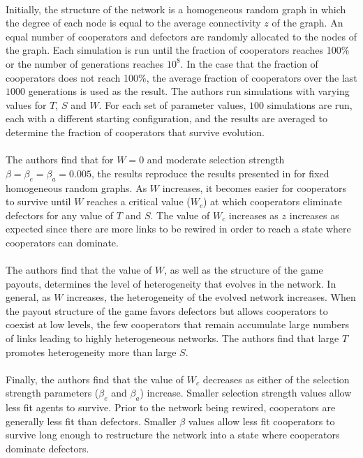 \documentclass{article}
\begin{document}
	\paragraph{}Initially, the structure of the network is a homogeneous random graph in which the degree of each node is equal to the average connectivity $z$ of the graph.  An equal number of cooperators and defectors are randomly allocated to the nodes of the graph.  Each simulation is run until the fraction of cooperators reaches 100\% or the number of generations reaches $10^8$.  In the case that the fraction of cooperators does not reach 100\%, the average fraction of cooperators over the last $1000$ generations is used as the result.  The authors run simulations with varying values for $T$, $S$ and $W$.  For each set of parameter values, $100$ simulations are run, each with a different starting configuration, and the results are averaged to determine the fraction of cooperators that survive evolution.
	\paragraph{}The authors find that for $W=0$ and moderate selection strength $\beta=\beta_e=\beta_a=0.005$, the results reproduce the results presented in \cite{Santos2006c} for fixed homogeneous random graphs.  As $W$ increases, it becomes easier for cooperators to survive until $W$ reaches a critical value ($W_c$) at which cooperators eliminate defectors for any value of $T$ and $S$.  The value of $W_c$ increases as $z$ increases as expected since there are more links to be rewired in order to reach a state where cooperators can dominate.
	\paragraph{}The authors find that the value of $W$, as well as the structure of the game payouts, determines the level of heterogeneity that evolves in the network.  In general, as $W$ increases, the heterogeneity of the evolved network increases.  When the payout structure of the game favors defectors but allows cooperators to coexist at low levels, the few cooperators that remain accumulate large numbers of links leading to highly heterogeneous networks.  The authors find that large $T$ promotes heterogeneity more than large $S$.
	\paragraph{}Finally, the authors find that the value of $W_c$ decreases as either of the selection strength parameters ($\beta_e$ and $\beta_a$) increase.  Smaller selection strength values allow less fit agents to survive.
	\newpage
	Prior to the network being rewired, cooperators are generally less fit than defectors.  Smaller $\beta$ values allow less fit cooperators to survive long enough to restructure the network into a state where cooperators dominate defectors.
\end{document}
